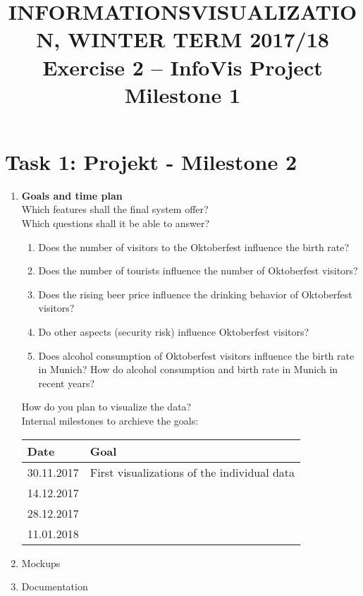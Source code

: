 \documentclass[11pt, twoside, BCOR=8mm, DIV=12]{scrartcl}
\title{{\Large INFORMATIONSVISUALIZATION, WINTER TERM 2017/18} \\ Exercise 2 – InfoVis Project Milestone 1}
\begin{document}
\maketitle
\section*{Task 1: Projekt - Milestone 2}
\begin{enumerate}[label=\alph*)]
\item \textbf{Goals and time plan}\\
Which features shall the final system offer?\\
Which questions shall it be able to answer?
\begin{enumerate}[label=\arabic*)]
\item Does the number of visitors to the Oktoberfest influence the birth rate?
\item Does the number of tourists influence the number of Oktoberfest visitors?
\item Does the rising beer price influence the drinking behavior of Oktoberfest visitors?
\item Do other aspects (security risk) influence Oktoberfest visitors?
\item Does alcohol consumption of  Oktoberfest visitors influence the birth rate in Munich? How do alcohol consumption and birth rate in Munich in recent years?
\end{enumerate}
How do you plan to visualize the data?\\
Internal milestones to archieve the goals:
\begin{table}[h]
\begin{tabular}{l l}
Date & Goal \\
\hline
30.11.2017 & First visualizations of the individual data\\
\hline
14.12.2017 & \\
\hline
28.12.2017 & \\
\hline
11.01.2018 & \\
\end{tabular}
\end{table}

\item Mockups
\item Documentation
\end{enumerate}
\end{document}
